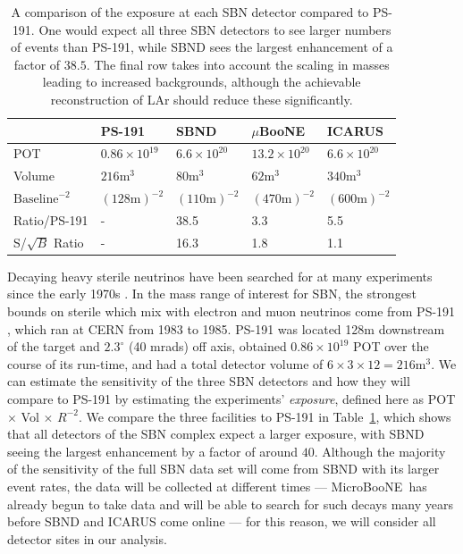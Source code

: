 \documentclass[11pt, a4paper]{article}
\newcommand{\reftab}[1]{Table~\ref{#1}}
\def\muboone{MicroBooNE}
\begin{document}
\begin{table}[t!]
\centering
\begin{tabular}{| l || l | l | l | l |}
	\hline
	& PS-191 & SBND & $\mu$BooNE & ICARUS \\ \hline \hline
	POT	& $0.86 \times 10^{19}$	& $6.6 \times 10^{20}$	&	$13.2 \times 10^{20}$     &  $6.6 \times 10^{20}$ \\ \hline
	Volume	& $216\text{m}^3$	&	$80\text{m}^3$	&	$62\text{m}^3$	     &   $340\text{m}^3$	\\ \hline
	$\text{Baseline}^{-2}$	& $(128 	\text{m} )^{-2}$	&$(110 \text{m} )^{-2}$	&	$(470 \text{m} )^{-2}$			     & $(600 \text{m} )^{-2}$	  \\ \hline
Ratio/PS-191 & - 	& 38.5 	& 3.3	& 5.5\\ \hline
	S/$\sqrt{B}$ Ratio & - 	& 16.3 	& 1.8	& 1.1\\ \hline
\end{tabular}

\caption{\label{tab:exposure} A comparison of the exposure at each SBN detector
compared to PS-191. One would expect all  three SBN detectors to see larger
numbers of events than PS-191, while SBND sees the largest enhancement of a
factor of $38.5$. The final row takes into account the scaling in masses leading to increased backgrounds, although the achievable reconstruction of LAr should reduce these significantly.}

\end{table}

Decaying heavy sterile neutrinos have been searched for at many experiments
since the early 1970s \cite{}. In the mass range of interest for SBN, the
strongest bounds on sterile which mix with electron and muon neutrinos come
from PS-191 \cite{Bernardi:1985ny}, which ran at CERN from 1983 to 1985. 
%
PS-191 was located 128m downstream of the target and $2.3^\circ$ (40 mrads) off
axis, obtained $0.86 \times 10^{19}$ POT over the course of its run-time, and
had a total detector volume of $6\times3\times12 = 216 \text{m}^3$. We can
estimate the sensitivity of the three SBN detectors and how they will compare
to PS-191 by estimating the experiments' \emph{exposure}, defined here as POT
$\times$ Vol $\times$ $R^{-2}$. We compare the three facilities to PS-191 in
\reftab{tab:exposure}, which shows that all detectors of the SBN complex expect
a larger exposure, with SBND seeing the largest enhancement by a factor of
around $40$. Although the majority of the sensitivity of the full SBN data set
will come from SBND with its larger event rates, the data will be collected at
different times --- \muboone\ has already begun to take data and will be able
to search for such decays many years before SBND and ICARUS come online --- for
this reason, we will consider all detector sites in our analysis.
\end{document}
